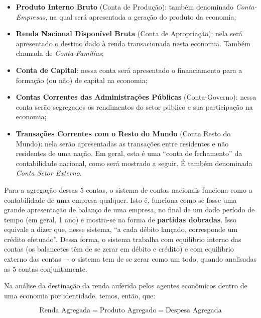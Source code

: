 \documentclass{article}\usepackage[]{graphicx}\usepackage[]{xcolor}
\begin{document}
\begin{itemize}
  \item \textbf{Produto Interno Bruto} (Conta de Produção): também denominado \textit{Conta-Empresas},
        na qual será apresentada a geração do produto da economia;

  \item \textbf{Renda Nacional Disponível Bruta} (Conta de Apropriação): nela será apresentado o destino dado
        à renda transacionada nesta economia. Também chamada de \textit{Conta-Famílias};

  \item \textbf{Conta de Capital}: nessa conta será apresentado o financiamento para a formação (ou não) de capital na economia;

  \item \textbf{Contas Correntes das Administrações Públicas} (Conta-Governo): nessa conta serão segregados os rendimentos
        do setor público e sua participação na economia;

  \item \textbf{Transações Correntes com o Resto do Mundo} (Conta Resto do Mundo): nela serão apresentadas as transações entre
        residentes e não residentes de uma nação. Em geral, esta é uma \enquote{conta de fechamento} da contabilidade nacional,
        como será mostrado a seguir. É também denominada \textit{Conta Setor Externo}.
\end{itemize}

Para a agregação dessas 5 contas, o sistema de contas nacionais funciona como a contabilidade de uma empresa qualquer.
Isto é, funciona como se fosse uma grande apresentação de balanço de uma empresa, no final de um dado período de tempo
(em geral, 1 ano) e  mostra-se na forma de \textbf{partidas dobradas}. Isso equivale a dizer que, nesse sistema,
\enquote{a cada débito lançado, corresponde um crédito efetuado}. Dessa forma, o sistema trabalha com equilíbrio interno das contas
(os balancetes têm de se zerar em débito e crédito) e com equilíbrio externo das contas –- o sistema tem de se zerar
como um todo, quando analisadas as 5 contas conjuntamente.

Na análise da destinação da renda auferida pelos agentes econômicos dentro de uma economia por identidade, temos, então, que:

\begin{equation}\label{eq1}
\text{Renda Agregada} = \text{Produto Agregado} = \text{Despesa Agregada}
\end{equation}
\end{document}
